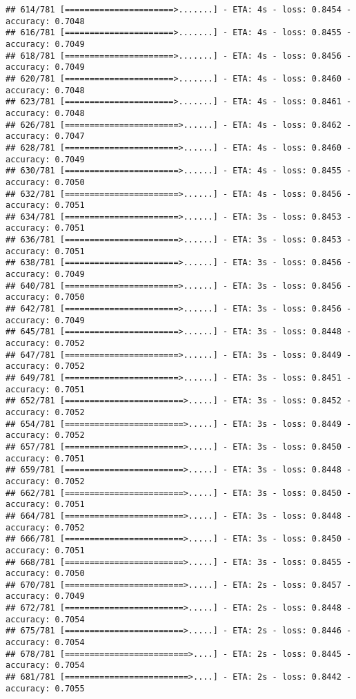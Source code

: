 \documentclass[
]{article}
\begin{document}
\begin{verbatim}
## 614/781 [======================>.......] - ETA: 4s - loss: 0.8454 - accuracy: 0.7048
## 616/781 [======================>.......] - ETA: 4s - loss: 0.8455 - accuracy: 0.7049
## 618/781 [======================>.......] - ETA: 4s - loss: 0.8456 - accuracy: 0.7049
## 620/781 [======================>.......] - ETA: 4s - loss: 0.8460 - accuracy: 0.7048
## 623/781 [======================>.......] - ETA: 4s - loss: 0.8461 - accuracy: 0.7048
## 626/781 [=======================>......] - ETA: 4s - loss: 0.8462 - accuracy: 0.7047
## 628/781 [=======================>......] - ETA: 4s - loss: 0.8460 - accuracy: 0.7049
## 630/781 [=======================>......] - ETA: 4s - loss: 0.8455 - accuracy: 0.7050
## 632/781 [=======================>......] - ETA: 4s - loss: 0.8456 - accuracy: 0.7051
## 634/781 [=======================>......] - ETA: 3s - loss: 0.8453 - accuracy: 0.7051
## 636/781 [=======================>......] - ETA: 3s - loss: 0.8453 - accuracy: 0.7051
## 638/781 [=======================>......] - ETA: 3s - loss: 0.8456 - accuracy: 0.7049
## 640/781 [=======================>......] - ETA: 3s - loss: 0.8456 - accuracy: 0.7050
## 642/781 [=======================>......] - ETA: 3s - loss: 0.8456 - accuracy: 0.7049
## 645/781 [=======================>......] - ETA: 3s - loss: 0.8448 - accuracy: 0.7052
## 647/781 [=======================>......] - ETA: 3s - loss: 0.8449 - accuracy: 0.7052
## 649/781 [=======================>......] - ETA: 3s - loss: 0.8451 - accuracy: 0.7051
## 652/781 [========================>.....] - ETA: 3s - loss: 0.8452 - accuracy: 0.7052
## 654/781 [========================>.....] - ETA: 3s - loss: 0.8449 - accuracy: 0.7052
## 657/781 [========================>.....] - ETA: 3s - loss: 0.8450 - accuracy: 0.7051
## 659/781 [========================>.....] - ETA: 3s - loss: 0.8448 - accuracy: 0.7052
## 662/781 [========================>.....] - ETA: 3s - loss: 0.8450 - accuracy: 0.7051
## 664/781 [========================>.....] - ETA: 3s - loss: 0.8448 - accuracy: 0.7052
## 666/781 [========================>.....] - ETA: 3s - loss: 0.8450 - accuracy: 0.7051
## 668/781 [========================>.....] - ETA: 3s - loss: 0.8455 - accuracy: 0.7050
## 670/781 [========================>.....] - ETA: 2s - loss: 0.8457 - accuracy: 0.7049
## 672/781 [========================>.....] - ETA: 2s - loss: 0.8448 - accuracy: 0.7054
## 675/781 [========================>.....] - ETA: 2s - loss: 0.8446 - accuracy: 0.7054
## 678/781 [=========================>....] - ETA: 2s - loss: 0.8445 - accuracy: 0.7054
## 681/781 [=========================>....] - ETA: 2s - loss: 0.8442 - accuracy: 0.7055

\end{verbatim}
\end{document}

